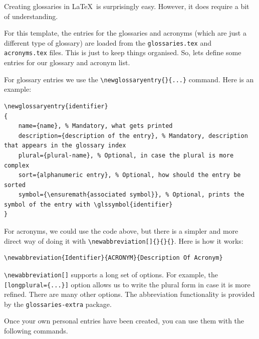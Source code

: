 Creating glossaries in \LaTeX\ is surprisingly easy. However, it does require a bit of understanding.

For this template, the entries for the glossaries and acronyms (which are just a different type of glossary) are loaded from the \texttt{glossaries.tex} and \texttt{acronyms.tex} files. This is just to keep things organised. So, lets define some entries for our glossary and acronym list.

For glossary entries we use the \verb|\newglossaryentry{}{...}| command. Here is an example:

\begin{lstlisting}[language={[LaTeX]TeX}]
\newglossaryentry{identifier}
{
	name={name}, % Mandatory, what gets printed
	description={description of the entry}, % Mandatory, description that appears in the glossary index
	plural={plural-name}, % Optional, in case the plural is more complex
	sort={alphanumeric entry}, % Optional, how should the entry be sorted
	symbol={\ensuremath{associated symbol}}, % Optional, prints the symbol of the entry with \glssymbol{identifier}
}
\end{lstlisting}

For acronyms, we could use the code above, but there is a simpler and more direct way of doing it with \verb|\newabbreviation[]{}{}{}|. Here is how it works:

\begin{lstlisting}[language={[LaTeX]TeX}]
\newabbreviation{Identifier}{ACRONYM}{Description Of Acronym}
\end{lstlisting}

\verb|\newabbreviation[]| supports a long set of options. For example, the \verb|[longplural={...}]| option allows us to write the plural form in case it is more refined. There are many other options. The abbreviation functionality is provided by the \verb|glossaries-extra| package.

Once your own personal entries have been created, you can use them with the following commands.


